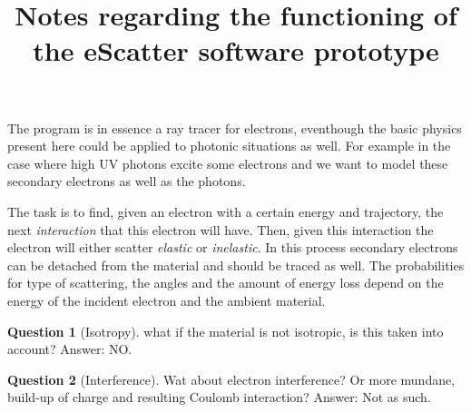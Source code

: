 \documentclass{article}
\title{Notes regarding the functioning of the eScatter software prototype}
\theoremstyle{definition}
\newtheorem{question}{Question}
\begin{document}
\maketitle

The program is in essence a ray tracer for electrons, eventhough the basic physics present here could be applied to photonic situations as well. For example in the case where high UV photons excite some electrons and we want to model these secondary electrons as well as the photons.

The task is to find, given an electron with a certain energy and trajectory, the next \emph{interaction} that this electron will have. Then, given this interaction the electron will either scatter \emph{elastic} or \emph{inelastic}. In this process secondary electrons can be detached from the material and should be traced as well. The probabilities for type of scattering, the angles and the amount of energy loss depend on the energy of the incident electron and the ambient material.

\begin{question}[Isotropy]
    what if the material is not isotropic, is this taken into account? Answer: NO.
\end{question}

\begin{question}[Interference]
    Wat about electron interference? Or more mundane, build-up of charge and resulting Coulomb interaction? Answer: Not as such.
\end{question}
\end{document}
